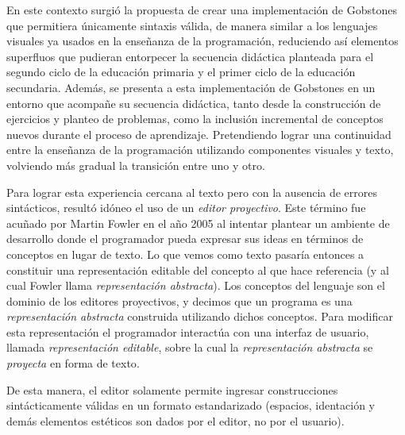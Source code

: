 En este contexto surgió la propuesta de crear una implementación de Gobstones que permitiera únicamente sintaxis válida, de manera similar a los lenguajes visuales ya usados en la enseñanza de la programación, reduciendo así elementos superfluos que pudieran entorpecer la secuencia didáctica planteada para el segundo ciclo de la educación primaria y el primer ciclo de la educación secundaria.
Además, se presenta a esta implementación de Gobstones en un entorno que acompañe su secuencia didáctica, tanto desde la construcción de ejercicios y planteo de problemas, como la inclusión incremental de conceptos nuevos durante el proceso de aprendizaje. Pretendiendo lograr una continuidad entre la enseñanza de la programación utilizando componentes visuales y texto, volviendo más gradual la transición entre uno y otro.


Para lograr esta experiencia cercana al texto pero con la ausencia de errores sintácticos, resultó idóneo el uso de un \emph{editor proyectivo}. Este término fue acuñado por Martin Fowler en el año 2005\cite{Fowler} al intentar plantear un ambiente de desarrollo donde el programador pueda expresar sus ideas en términos de conceptos en lugar de texto. Lo que vemos como texto pasaría entonces a constituir una representación editable del concepto al que hace referencia (y al cual Fowler llama \textit{representación abstracta}). Los conceptos del lenguaje son el dominio de los editores proyectivos, y decimos que un programa es una \textit{representación abstracta} construida utilizando dichos conceptos. Para modificar esta representación el programador interactúa con una interfaz de usuario, llamada \textit{representación editable}, sobre la cual la \textit{representación abstracta} se \textit{proyecta} en forma de texto\cite{voelter2014projectional}. 

De esta manera, el editor solamente permite ingresar construcciones sintácticamente válidas en un formato estandarizado (espacios, identación y demás elementos estéticos son dados por el editor, no por el usuario).

